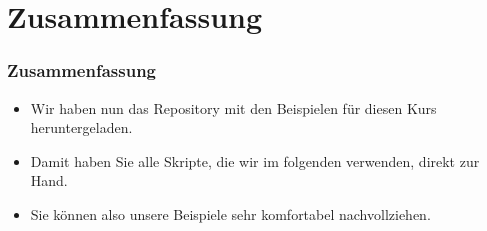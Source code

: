 \documentclass[aspectratio=169,mathserif,notheorems]{beamer}%
\begin{document}
\section{Zusammenfassung}%
%
\begin{frame}%
\frametitle{Zusammenfassung}%
\begin{itemize}%
\item Wir haben nun das Repository mit den Beispielen für diesen Kurs heruntergeladen.%
\item<2-> Damit haben Sie alle Skripte, die wir im folgenden verwenden, direkt zur Hand.%
\item<3-> Sie können also unsere Beispiele sehr komfortabel nachvollziehen.%
\end{itemize}%
\end{frame}%
%
\endPresentation%
\end{document}
